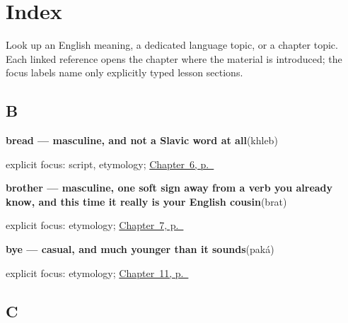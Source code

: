 
\chapter*{Index}

Look up an English meaning, a dedicated language topic, or a chapter topic. Each linked reference opens the chapter where the material is introduced; the focus labels name only explicitly typed lesson sections.

\section*{B}

\noindent\begin{minipage}[t]{\linewidth}
\raggedright
\textbf{bread — masculine, and not a Slavic word at all}\enspace\emph{}\enspace(khleb)\par
\footnotesize explicit focus: script, etymology; \hyperref[ch:russian-water-coffee-tea-bread]{Chapter~6, p.~\pageref*{ch:russian-water-coffee-tea-bread}}
\end{minipage}\par\smallskip

\noindent\begin{minipage}[t]{\linewidth}
\raggedright
\textbf{brother — masculine, one soft sign away from a verb you already know, and this time it really is your English cousin}\enspace\emph{}\enspace(brat)\par
\footnotesize explicit focus: etymology; \hyperref[ch:russian-friend-and-siblings]{Chapter~7, p.~\pageref*{ch:russian-friend-and-siblings}}
\end{minipage}\par\smallskip

\noindent\begin{minipage}[t]{\linewidth}
\raggedright
\textbf{bye — casual, and much younger than it sounds}\enspace\emph{}\enspace(paká)\par
\footnotesize explicit focus: etymology; \hyperref[ch:russian-parting-words]{Chapter~11, p.~\pageref*{ch:russian-parting-words}}
\end{minipage}\par\smallskip

\section*{C}

